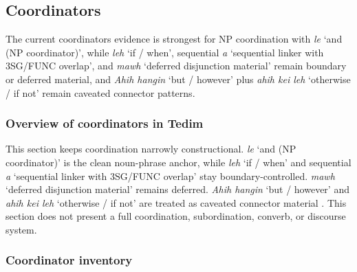 \documentclass[
  11pt,
  a4paper,
]{article}
\newcommand{\tdim}[1]{\textit{#1}}
\newcommand{\glossquote}[1]{`#1'}
\begin{document}
\subsection{Coordinators}\label{coordinators}

The current coordinators evidence is strongest for NP coordination with
\tdim{le} \glossquote{and (NP coordinator)}, while \tdim{leh}
\glossquote{if / when}, sequential \tdim{a}
\glossquote{sequential linker with 3SG/FUNC overlap}, and \tdim{mawh}
\glossquote{deferred disjunction material} remain boundary or deferred
material, and \tdim{Ahih hangin} \glossquote{but / however} plus
\tdim{ahih kei leh} \glossquote{otherwise / if not} remain caveated
connector patterns.

\subsubsection{Overview of coordinators in
Tedim}\label{overview-of-coordinators-in-tedim}

This section keeps coordination narrowly constructional. \tdim{le}
\glossquote{and (NP coordinator)} is the clean noun-phrase anchor, while
\tdim{leh} \glossquote{if / when} and sequential \tdim{a}
\glossquote{sequential linker with 3SG/FUNC overlap} stay
boundary-controlled. \tdim{mawh}
\glossquote{deferred disjunction material} remains deferred.
\tdim{Ahih hangin} \glossquote{but / however} and \tdim{ahih kei leh}
\glossquote{otherwise / if not} are treated as caveated connector
material \citep{henderson1965, zamngaihcing2017}. This section does not
present a full coordination, subordination, converb, or discourse
system.

\subsubsection{Coordinator inventory}\label{coordinator-inventory}
\end{document}
